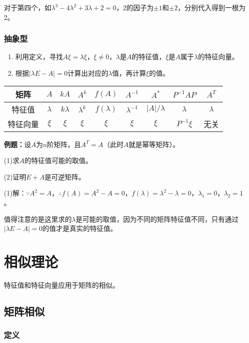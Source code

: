 \documentclass[UTF8, 12pt]{ctexart}
\begin{document}
对于第四个，如$\lambda^3-4\lambda^2+3\lambda+2=0$，2的因子为$\pm1$和$\pm2$，分别代入得到一根为2。

\subsubsection{抽象型}

\begin{enumerate}
    \item 利用定义，寻找$A\xi=\lambda\xi$，$\xi\neq0$，$\lambda$是$A$的特征值，$\xi$是$A$属于$\lambda$的特征向量。
    \item 根据$\vert\lambda E-A\vert=0$计算出对应的$\lambda$值，再计算$\xi$的值。
\end{enumerate}

\begin{tabular}{|c|c|c|c|c|c|c|c|c|}
    \hline
    矩阵 & $A$ & $kA$ & $A^k$ & $f(A)$ & $A^{-1}$ & $A^*$ & $P^{-1}AP$ & $A^T$ \\ \hline
    特征值 & $\lambda$ & $k\lambda$ & $\lambda^k$ & $f(\lambda)$ & $\lambda^{-1}$ & $\vert A\vert/\lambda$ & $\lambda$ & $\lambda$ \\ \hline
    特征向量 & $\xi$ & $\xi$ & $\xi$ & $\xi$ & $\xi$ & $\xi$ & $P^{-1}\xi$ & 无关 \\
    \hline
\end{tabular} \medskip

\textbf{例题：}设$A$为$n$阶矩阵，且$A^T=A$（此时$A$就是幂等矩阵）。

(1)求$A$的特征值可能的取值。

(2)证明$E+A$是可逆矩阵。

(1)解：$\because A^2=A$，$\therefore f(A)=A^2-A=0$，$f(\lambda)=\lambda^2-\lambda=0$，$\lambda_1=0$，$\lambda_2=1$。

值得注意的是这里求的$\lambda$是可能的取值，因为不同的矩阵特征值不同，只有通过$\vert\lambda E-A\vert=0$的值才是真实的特征值。

\section{相似理论}

特征值和特征向量应用于矩阵的相似。

\subsection{矩阵相似}

\subsubsection{定义}
\end{document}
